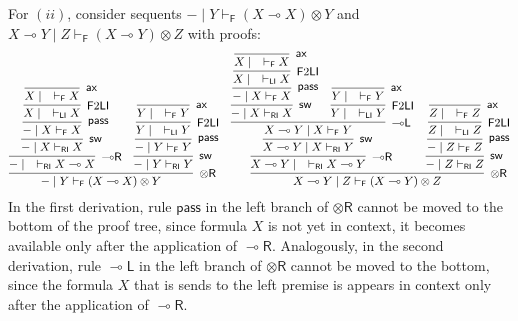 \documentclass[submission,copyright,creativecommons]{eptcs}
\theoremstyle{definition}
\newcommand{\tr}{\otimes \mathsf{R}}
\newcommand{\lright}{{\multimap}\mathsf{R}}
\newcommand{\lleft}{{\multimap}\mathsf{L}}
\newcommand{\pass}{\mathsf{pass}}
\newcommand{\ax}{\mathsf{ax}}
\newcommand{\ot}{\otimes}
\newcommand{\lolli}{\multimap}
\newcommand{\RI}{\mathsf{RI}}
\newcommand{\LI}{\mathsf{LI}}
\newcommand{\F}{\mathsf{F}}
\newcommand{\SkNMILLA}{$\mathtt{SkNMILLA}$}
\begin{document}
For $(ii)$, consider sequents ${-} \mid Y \vdash_{\F} (X \lolli X) \ot Y$ and $X \lolli Y \mid Z \vdash_{\F} (X \lolli Y) \ot Z$ with proofs:
\begin{equation*}\label{eq:counterexample1}
  \small
       \infer[\tr]{{-} \mid Y \vdash_{\F} (X \lolli X) \ot Y}{
      \infer[\lright]{{-} \mid \quad \vdash_{\RI} X \lolli X}{
        \infer[\mathsf{sw}]{{-} \mid X \vdash_{\RI} X}{
          \infer[\pass]{{-} \mid X \vdash_{\F} X}{
            \infer[\F 2 \LI]{X \mid \quad \vdash_{\LI} X}{
              \infer[\ax]{X \mid \quad \vdash_{\F} X}{}
            }
          }
        }
      }
      &
      \infer[\mathsf{sw}]{{-} \mid Y \vdash_{\RI} Y}{
        \infer[\pass]{{-} \mid Y \vdash_{\F} Y}{
          \infer[\F 2 \LI]{Y \mid \quad \vdash_{\LI} Y}{
            \infer[\ax]{Y \mid \quad \vdash_{\F} Y}{}
          }
        }
      }
     }
\quad
     \infer[\tr]{X \lolli Y \mid Z \vdash_{\F} (X \lolli Y) \ot Z}{
      \infer[\lright]{X \lolli Y \mid \quad \vdash_{\RI} X \lolli Y}{
        \infer[\mathsf{sw}]{X \lolli Y \mid X \vdash_{\RI} Y}{
          \infer[\lleft]{X \lolli Y \mid X \vdash_{\F} Y}{
            \infer[\mathsf{sw}]{{-} \mid X \vdash_{\RI} X}{
              \infer[\pass]{{-} \mid X \vdash_{\F} X}{
                \infer[\F 2 \LI]{X \mid \quad \vdash_{\LI} X}{
                  \infer[\ax]{X \mid \quad \vdash_{\F} X}{}
                }
              }
            }
            &
            \infer[\F 2 \LI]{Y \mid \quad \vdash_{\LI} Y}{
              \infer[\ax]{Y \mid \quad \vdash_{\F} Y}{}
            }
          }
        }
      }
      &
      \infer[\mathsf{sw}]{{-} \mid Z \vdash_{\RI} Z}{
        \infer[\pass]{{-} \mid Z \vdash_{\F} Z}{
          \infer[\F 2 \LI]{Z \mid \quad \vdash_{\LI} Z}{
            \infer[\ax]{Z \mid \quad \vdash_{\F} Z}{}
          }
        }
      }
     }     
\end{equation*}
In the first derivation, rule $\pass$ in the left branch of $\tr$ cannot be moved to the bottom of the proof tree, since formula $X$ is not yet in context, it becomes available only after the application of $\lright$. Analogously, in the second derivation, rule $\lleft$ in the left branch of $\tr$ cannot be moved to the bottom, since the formula $X$ that is sends to the left premise is appears in context only after the application of $\lright$.

\end{document}
